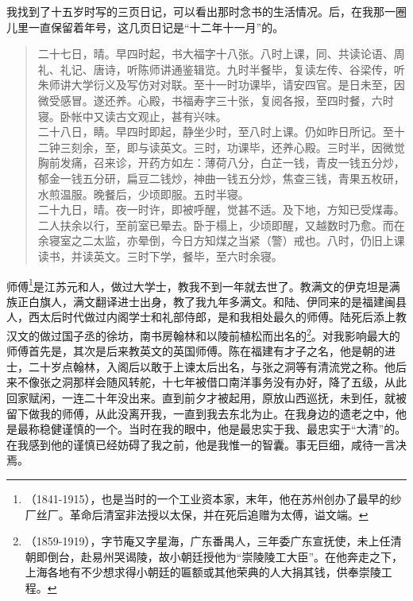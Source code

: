 我找到了十五岁时写的三页日记，可以看出那时念书的生活情况。后，在我那一圈儿里一直保留着年号，这几页日记是“十二年十一月”的。\\

\begin{quote}
	二十七日，晴。早四时起，书大福字十八张。八时上课，同、共读论语、周礼、礼记、唐诗，听陈师讲通鉴辑览。九时半餐毕，复读左传、谷梁传，听朱师讲大学衍义及写仿对对联。至十一时功课毕，请安四官。是日未至，因微受感冒。遂还养。心殿，书福寿字三十张，复阅各报，至四时餐，六时寝。卧帐中又读古文观止，甚有兴味。\\

二十八日，睛。早四时即起，静坐少时，至八时上课。仍如昨日所记。至十二钟三刻余，至，即与读英文。三时，功课毕，还养心殿。三时半，因微觉胸前发痛，召来诊，开药方如左：薄荷八分，白芷一钱，青皮一钱五分炒，郁金一钱五分研，扁豆二钱炒，神曲一钱五分炒，焦查三钱，青果五枚研，水煎温服。晚餐后，少顷即服。五时半寝。\\

二十九日，晴。夜一时许，即被呼醒，觉甚不适。及下地，方知已受煤毒。二人扶余以行，至前室已晕去。卧于榻上，少顷即醒，又越数时乃愈。而在余寝室之二太监，亦晕倒，今日方知煤之当紧（警）戒也。八时，仍旧上课读书，并读英文。三时下学，餐毕，至六时余寝。\\
\end{quote}

师傅\footnote{（1841-1915），也是当时的一个工业资本家，末年，他在苏州创办了最早的纱厂丝厂。革命后清室非法授以太保，并在死后追赠为太傅，谥文端。}是江苏元和人，做过大学士，教我不到一年就去世了。教满文的伊克坦是满族正白旗人，满文翻译进士出身，教了我九年多满文。和陆、伊同来的是福建闽县人，西太后时代做过内阁学士和礼部侍郎，是和我相处最久的师傅。陆死后添上教汉文的做过国子丞的徐坊，南书房翰林和以陵前植松而出名的\footnote{（1859-1919），字节庵又字星海，广东番禺人，三年委广东宣抚使，未上任清朝即倒台，赴易州哭谒陵，故小朝廷授他为“崇陵陵工大臣”。在他奔走之下，上海各地有不少想求得小朝廷的匾额或其他荣典的人大捐其钱，供奉崇陵工程。}。对我影响最大的师傅首先是，其次是后来教英文的英国师傅。陈在福建有才子之名，他是朝的进士，二十岁点翰林，入阁后以敢于上谏太后出名，与张之洞等有清流党之称。他后来不像张之洞那样会随风转舵，十七年被借口南洋事务没有办好，降了五级，从此回家赋闲，一连二十年没出来。直到前夕才被起用，原放山西巡抚，未到任，就被留下做我的师傅，从此没离开我，一直到我去东北为止。在我身边的遗老之中，他是最称稳健谨慎的一个。当时在我的眼中，他是最忠实于我、最忠实于“大清”的。在我感到他的谨慎已经妨碍了我之前，他是我惟一的智囊。事无巨细，咸待一言决焉。\\

